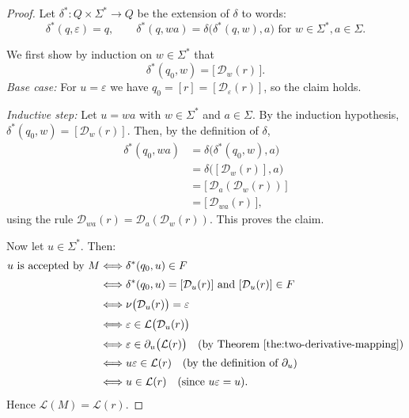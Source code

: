 \begin{proof}
Let $\delta^* : Q \times \Sigma^* \to Q$ be the extension of
$\delta$ to words:
\[
  \delta^*(q,\varepsilon) = q,
  \qquad
  \delta^*(q,wa) = \delta\bigl(\delta^*(q,w),a\bigr)
  \text{ for } w \in \Sigma^*, a \in \Sigma.
\]

We first show by induction on $w \in \Sigma^*$ that
\[
  \delta^*(q_0,w) = \bigl[\,\mathcal{D}_w(r)\,\bigr].
\]
\emph{Base case:} For $u = \varepsilon$ we have
$q_0 = [r] = [\mathcal{D}_\varepsilon(r)]$, so the claim holds.

\emph{Inductive step:} Let $u = wa$ with $w \in \Sigma^*$ and $a \in \Sigma$.
By the induction hypothesis,
$\delta^*(q_0,w) = [\mathcal{D}_w(r)]$.
Then, by the definition of $\delta$,
\[
  \begin{aligned}
    \delta^*(q_0,wa)
  &= \delta\bigl(\delta^*(q_0,w),a\bigr) \\
  &= \delta\bigl([\mathcal{D}_w(r)],a\bigr) \\
  &= \bigl[\,\mathcal{D}_a(\mathcal{D}_w(r))\,\bigr] \\
  &= \bigl[\,\mathcal{D}_{wa}(r)\,\bigr],
  \end{aligned}
\]
using the rule $\mathcal{D}_{wa}(r) = \mathcal{D}_a(\mathcal{D}_w(r))$.
This proves the claim.

Now let $u \in \Sigma^*$. Then:
\[
\begin{aligned}
u \text{ is accepted by } M
&\Longleftrightarrow \delta^*(q_0,u) \in F \\[0.5ex]
&\Longleftrightarrow \delta^*(q_0,u) = [\mathcal{D}_u(r)]
             \text{ and } [\mathcal{D}_u(r)] \in F
             \quad\\[0.5ex]
&\Longleftrightarrow \nu\bigl(\mathcal{D}_u(r)\bigr) = \varepsilon \\[0.5ex]
&\Longleftrightarrow \varepsilon \in \mathcal{L}\bigl(\mathcal{D}_u(r)\bigr) \\[0.5ex]
&\Longleftrightarrow \varepsilon \in \partial_u\bigl(\mathcal{L}(r)\bigr)
     \quad\text{(by Theorem~\ref{the:two-derivative-mapping})} \\[0.5ex]
&\Longleftrightarrow u\varepsilon \in \mathcal{L}(r)
     \quad\text{(by the definition of }\partial_u\text{)} \\[0.5ex]
&\Longleftrightarrow u \in \mathcal{L}(r)
     \quad\text{(since }u\varepsilon = u\text{).}
\end{aligned}
\]
Hence $\mathcal{L}(M) = \mathcal{L}(r)$.

\end{proof}

